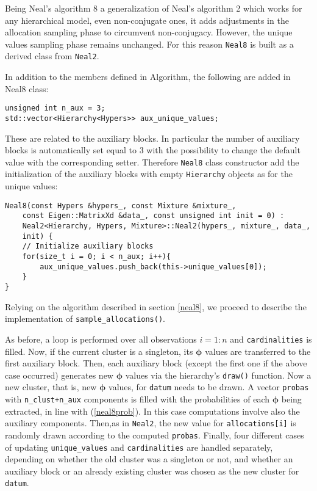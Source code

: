 Being Neal's algorithm 8 a generalization of Neal's algorithm 2 which works for any hierarchical model, even non-conjugate ones, it adds adjustments in the allocation sampling phase to circumvent non-conjugacy.
However, the unique values sampling phase remains unchanged. For this reason \verb|Neal8| is built as a derived class from \verb|Neal2|.

In addition to the members defined in Algorithm, the following are added in Neal8 class:
\begin{verbatim}
unsigned int n_aux = 3;
std::vector<Hierarchy<Hypers>> aux_unique_values;
\end{verbatim}
These are related to the auxiliary blocks. In particular the number of auxiliary blocks is automatically set equal to 3 with the possibility to change the default value with the corresponding setter.
Therefore \verb|Neal8| class constructor add the initialization of the auxiliary blocks with empty \verb|Hierarchy| objects as for the unique values:
\begin{verbatim}
Neal8(const Hypers &hypers_, const Mixture &mixture_,
    const Eigen::MatrixXd &data_, const unsigned int init = 0) :
    Neal2<Hierarchy, Hypers, Mixture>::Neal2(hypers_, mixture_, data_,
    init) {
    // Initialize auxiliary blocks
    for(size_t i = 0; i < n_aux; i++){
        aux_unique_values.push_back(this->unique_values[0]);
    }
}

\end{verbatim}



Relying on the algorithm described in section \ref{neal8}, we proceed to describe the implementation of \verb|sample_allocations()|.

As before, a loop is performed over all observations $i=1:n$ and \verb|cardinalities| is filled. Now, if the current cluster is a singleton, its $\boldsymbol\phi$ values are transferred to the first auxiliary block. Then, each auxiliary block (except the first one if the above case occurred) generates new $\boldsymbol\phi$ values via the hierarchy's \verb|draw()| function. Now a new cluster, that is, new $\boldsymbol\phi$ values, for \verb|datum| needs to be drawn. 	A vector \verb|probas| with \verb|n_clust+n_aux| components is filled with the probabilities of each $\boldsymbol\phi$ being extracted, in line with (\ref{neal8prob}). In this case computations involve also the auxiliary components. Then,as in \verb|Neal2|, the new value for \verb|allocations[i]| is randomly drawn according to the computed \verb|probas|. Finally, four different cases of updating \verb|unique_values| and \verb|cardinalities| are handled separately, depending on whether the old cluster was a singleton or not, and whether an auxiliary block or an already existing cluster was chosen as the new cluster for \verb|datum|.
